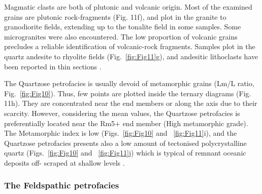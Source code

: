 \documentclass[twoside]{article}
\begin{document}
\medskip
Magmatic clasts are both of plutonic and volcanic origin. Most of the examined grains are plutonic rock-fragments (Fig. 11f), and plot in the granite to granodiorite fields, extending up to the tonalite field in some samples. Some microgranites were also encountered. The low proportion of volcanic grains precludes a reliable identification of volcanic-rock fragments. Samples plot in the quartz andesite to rhyolite fields (Fig.~\ref{fig:Fig11}g), and andesitic lithoclasts have been reported in thin sections \citep{Ospina-Ostios2013}.\par
\medskip
The Quartzose petrofacies is usually devoid of metamorphic grains (Lm/L ratio, Fig.~\ref{fig:Fig10}). Thus, few points are plotted inside the ternary diagrams (Fig. 11h). They are concentrated near the end members or along the axis due to their scarcity. However, considering the mean values, the Quartzose petrofacies is preferentially located near the Rm5+ end member (High metamorphic grade). The Metamorphic index is low (Figs.~\ref{fig:Fig10} and ~\ref{fig:Fig11}i), and the Quartzose petrofacies presents also a low amount of tectonised polycrystalline quartz (Figs.~\ref{fig:Fig10} and ~\ref{fig:Fig11}j) which is typical of remnant oceanic deposits off- scraped at shallow levels \citep{Garzanti2010}.

\subsubsection{The Feldspathic petrofacies}
\end{document}
